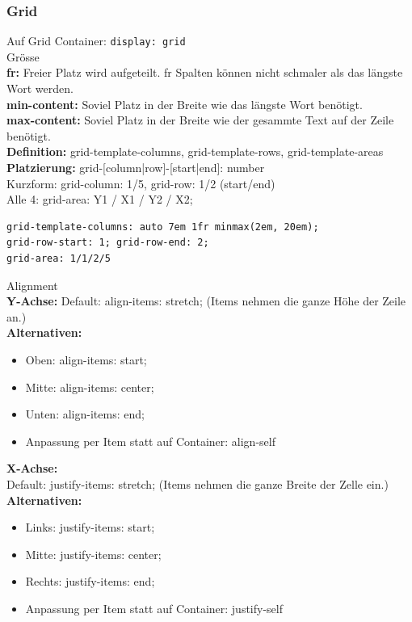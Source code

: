\subsubsection{Grid}
Auf Grid Container: \texttt{display: grid}\\
\textcolor{subsectioncolor}{Grösse}\\
\textbf{fr:} Freier Platz wird aufgeteilt. fr Spalten können nicht schmaler als das längste Wort werden.\\
\textbf{min-content:} Soviel Platz in der Breite wie das längste Wort benötigt.\\
\textbf{max-content:} Soviel Platz in der Breite wie der gesammte Text auf der Zeile benötigt.\\
\textbf{Definition:} grid-template-columns, grid-template-rows, grid-template-areas\\
\textbf{Platzierung:} grid-[column|row]-[start|end]: number\\
Kurzform: grid-column: 1/5, grid-row: 1/2 (start/end)\\
Alle 4: grid-area: Y1 / X1 / Y2 / X2;
\begin{lstlisting}
grid-template-columns: auto 7em 1fr minmax(2em, 20em);
grid-row-start: 1; grid-row-end: 2;
grid-area: 1/1/2/5
\end{lstlisting}
\textcolor{subsectioncolor}{Alignment}\\
\textbf{Y-Achse:} Default: align-items: stretch; (Items nehmen die ganze Höhe der Zeile an.)\\
\textbf{Alternativen:}
\begin{itemize}
    \item Oben: align-items: start;
    \item Mitte: align-items: center;
    \item Unten: align-items: end;
    \item Anpassung per Item statt auf Container: align-self
\end{itemize}
\textbf{X-Achse:}\\
Default: justify-items: stretch; (Items nehmen die ganze Breite der Zelle ein.) \\
\textbf{Alternativen:}
\begin{itemize}
    \item Links: justify-items: start;
    \item Mitte: justify-items: center;
    \item Rechts: justify-items: end;
    \item Anpassung per Item statt auf Container: justify-self
\end{itemize}

\vfill
$ $
\columnbreak